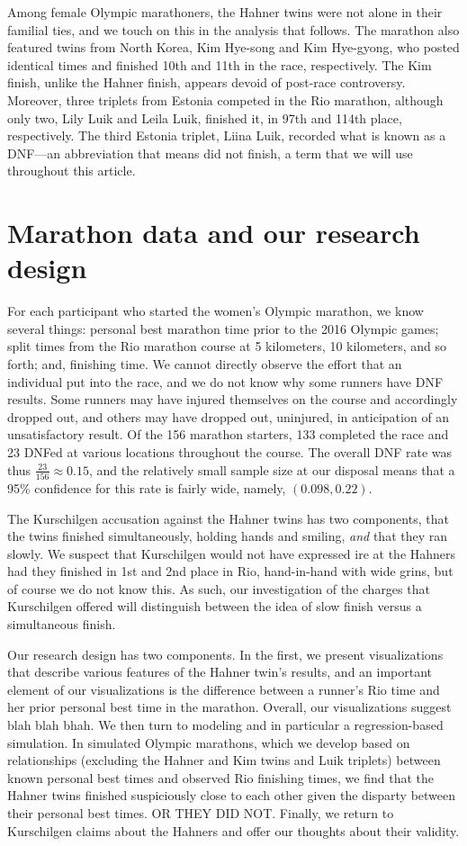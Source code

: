 \documentclass[12pt,titlepage]{article}
\begin{document}
Among female Olympic marathoners, the Hahner twins were not alone in
their familial ties, and we touch on this in the analysis that
follows.  The marathon also featured twins from North Korea, Kim
Hye-song and Kim Hye-gyong, who posted identical times and finished
10th and 11th in the race, respectively. The Kim finish, unlike the
Hahner finish, appears devoid of post-race controversy. Moreover,
three triplets from Estonia competed in the Rio marathon, although
only two, Lily Luik and Leila Luik, finished it, in 97th and 114th
place, respectively. The third Estonia triplet, Liina Luik, recorded
what is known as a DNF---an abbreviation that means did not finish, a
term that we will use throughout this article.

\section*{Marathon data and our research design}

For each participant who started the women's Olympic marathon, we know
several things: personal best marathon time prior to the 2016 Olympic
games; split times from the Rio marathon course at 5 kilometers, 10
kilometers, and so forth; and, finishing time. We cannot directly
observe the effort that an individual put into the race, and we do not
know why some runners have DNF results.  Some runners may have injured
themselves on the course and accordingly dropped out, and others may
have dropped out, uninjured, in anticipation of an unsatisfactory
result. Of the 156 marathon starters, 133 completed the race and 23
DNFed at various locations throughout the course. The overall DNF rate
was thus $\frac{23}{156} \approx 0.15$, and the relatively small
sample size at our disposal means that a 95\% confidence for this rate
is fairly wide, namely, $\left(0.098, 0.22\right)$. 

The Kurschilgen accusation against the Hahner twins has two
components, that the twins finished simultaneously, holding hands and
smiling, \emph{and} that they ran slowly.  We suspect that Kurschilgen
would not have expressed ire at the Hahners had they finished in 1st
and 2nd place in Rio, hand-in-hand with wide grins, but of course we
do not know this.  As such, our investigation of the charges that
Kurschilgen offered will distinguish between the idea of slow finish
versus a simultaneous finish.

Our research design has two components.  In the first, we present
visualizations that describe various features of the Hahner twin's
results, and an important element of our visualizations is the
difference between a runner's Rio time and her prior personal best
time in the marathon.  Overall, our visualizations suggest blah blah
bhah.  We then turn to modeling and in particular a regression-based
simulation.  In simulated Olympic marathons, which we develop based on
relationships (excluding the Hahner and Kim twins and Luik triplets)
between known personal best times and observed Rio finishing times, we
find that the Hahner twins finished suspiciously close to each other
given the disparty between their personal best times.  OR THEY DID
NOT.  Finally, we return to Kurschilgen claims  about the Hahners and
offer our thoughts about their validity.
\end{document}
